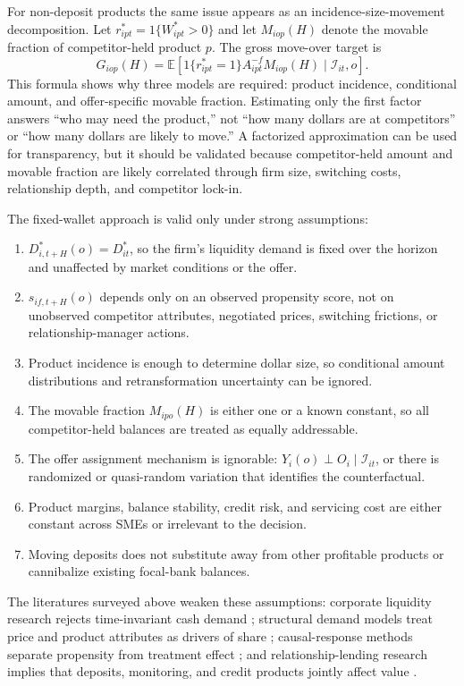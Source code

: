 \documentclass[11pt]{article}
\begin{document}
For non-deposit products the same issue appears as an incidence-size-movement
decomposition. Let $r_{ipt}^{*}=1\{W_{ipt}^{*}>0\}$ and let $M_{iop}(H)$ denote
the movable fraction of competitor-held product $p$. The gross move-over target
is
\[
  G_{iop}(H)
  =
  \mathbb{E}\!\left[
  1\{r_{ipt}^{*}=1\}A_{ipt}^{-f}M_{iop}(H)
  \mid \mathcal{I}_{it},o
  \right].
\]
This formula shows why three models are required: product incidence, conditional
amount, and offer-specific movable fraction. Estimating only the first factor
answers ``who may need the product,'' not ``how many dollars are at competitors''
or ``how many dollars are likely to move.'' A factorized approximation can be
used for transparency, but it should be validated because competitor-held
amount and movable fraction are likely correlated through firm size, switching
costs, relationship depth, and competitor lock-in.

The fixed-wallet approach is valid only under strong assumptions:
\begin{enumerate}[leftmargin=*]
  \item $D_{i,t+H}^{*}(o)=D_{it}^{*}$, so the firm's liquidity demand is fixed
  over the horizon and unaffected by market conditions or the offer.
  \item $s_{if,t+H}(o)$ depends only on an observed propensity score, not on
  unobserved competitor attributes, negotiated prices, switching frictions, or
  relationship-manager actions.
  \item Product incidence is enough to determine dollar size, so conditional
  amount distributions and retransformation uncertainty can be ignored.
  \item The movable fraction $M_{ipo}(H)$ is either one or a known constant,
  so all competitor-held balances are treated as equally addressable.
  \item The offer assignment mechanism is ignorable:
  $Y_i(o)\perp O_i\mid \mathcal{I}_{it}$, or there is randomized or
  quasi-random variation that identifies the counterfactual.
  \item Product margins, balance stability, credit risk, and servicing cost are
  either constant across SMEs or irrelevant to the decision.
  \item Moving deposits does not substitute away from other profitable products
  or cannibalize existing focal-bank balances.
\end{enumerate}
The literatures surveyed above weaken these assumptions: corporate liquidity
research rejects time-invariant cash demand
\citep{opler1999cash,almeida2004cash,bates2009cash,acharya2020dash};
structural demand models treat price and product attributes as drivers of share
\citep{berry1995automobile,dick2008demand}; causal-response methods separate
propensity from treatment effect
\citep{lo2002true,athey2016recursive,wager2018causalforests}; and
relationship-lending research implies that deposits, monitoring, and credit
products jointly affect value
\citep{petersen1994benefits,berger1995relationship,mester2007transactions,norden2010creditline}.
\end{document}
